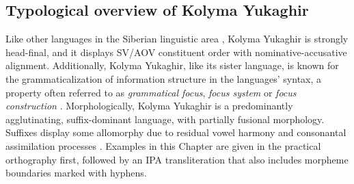 \documentclass[output=paper,colorlinks,citecolor=brown
\ChapterDOI{10.5281/zenodo.15697581}
]{langscibook}
\begin{document}



\subsection{Typological overview of Kolyma Yukaghir}
Like other languages in the Siberian linguistic area \citep{Anderson2006, Pakendorf2024}, Kolyma Yukaghir is strongly head-final, and it displays SV/AOV constituent order with nominative-accusative alignment. 
Additionally, Kolyma Yukaghir, like its sister language, is known for the grammaticalization of information structure in the languages' syntax, a property often referred to as \textit{grammatical focus}, \textit{focus system} or \textit{focus construction} \citep{Comrie1981, Krejnovich1982, Maslova1997, Maslova2003, Nagasaki2018, Nikolaeva&Xelimskij1997}.
Morphologically, Kolyma Yukaghir is a predominantly agglutinating, suffix-dominant language, with partially fusional morphology. 
Suffixes display some allomorphy due to residual vowel harmony and consonantal assimilation processes \citep{Krejnovich1982, Maslova2003, Nagasaki2010}.
Examples in this Chapter are given in the practical orthography first, followed by an IPA transliteration that also includes morpheme boundaries marked with hyphens.
\end{document}
